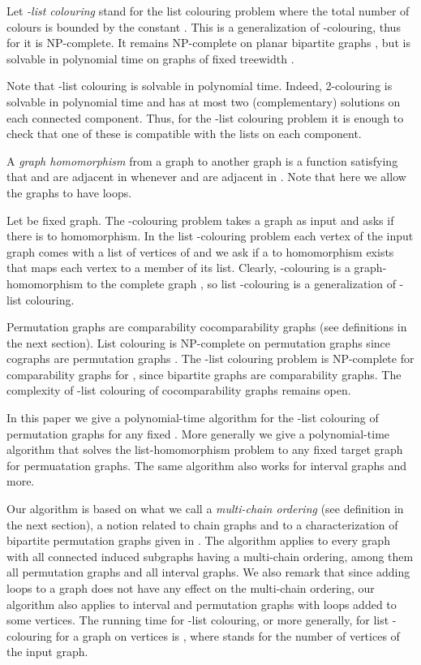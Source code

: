 \documentclass[12pt]{llncs}
\begin{document}
Let {\em -list colouring} stand for the list colouring problem where the total number of colours is bounded by the constant . This is a generalization of -colouring, thus for  it is NP-complete.  It remains NP-complete on planar bipartite graphs \cite{kratochvilFixedColourBound}, but is solvable in polynomial time on graphs of fixed treewidth \cite{bigPaper}.    

Note that -list colouring is solvable in polynomial time. Indeed,
2-colouring is solvable in polynomial time and has at most two
(complementary) solutions on each connected component. Thus, for the
-list colouring problem it is enough to check that one of these is
compatible with the lists on each component.

A {\em graph homomorphism} from a graph  to another graph  is a
function  satisfying that  and  are adjacent in
 whenever  and  are adjacent in . Note that here we allow the
graphs to have loops.

Let  be fixed graph. The -colouring problem takes a graph  as
input and asks if there is  to  homomorphism. In the list -colouring
problem each vertex of the input graph comes with a list of vertices of 
and we ask if a  to  homomorphism exists that maps each vertex to a
member of its list. Clearly, -colouring is a
graph-homomorphism to the complete graph , so list -colouring is a
generalization of -list colouring.

Permutation graphs are comparability cocomparability graphs (see definitions
in the next section). List colouring is NP-complete
on permutation graphs since cographs are
permutation graphs \cite{jansenScheffler}. The -list colouring problem is
NP-complete for comparability graphs for , since bipartite graphs are
comparability graphs. The complexity of -list colouring of cocomparability
graphs remains open.

In this paper we give a polynomial-time algorithm for the -list colouring
of permutation graphs for any fixed . More generally we give a
polynomial-time algorithm that solves the list-homomorphism problem to any
fixed target graph for permuatation graphs. The same algorithm also works for
interval graphs and more.

Our algorithm is based on what we call a {\em multi-chain
ordering} (see definition in the next section), a notion related to 
chain graphs \cite{Yann} and to a characterization of 
bipartite permutation graphs given in \cite{BL}.
The algorithm applies to every graph with all connected induced subgraphs
having a multi-chain ordering, among them all permutation graphs and
all interval graphs. We also remark that since adding loops to a graph does not have
any effect on the multi-chain ordering, our algorithm also applies to interval
and permutation graphs with loops added to some vertices.
The running time for -list colouring, or more
generally, for list -colouring for a graph  on  vertices is
, where  stands for the number of vertices of the input
graph.
\end{document}
